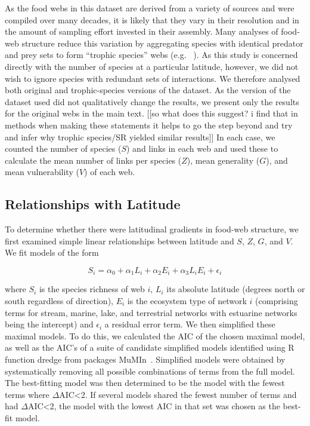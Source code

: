 \documentclass[12pt]{article}
\begin{document}
As the food webs in this dataset are derived from a variety of sources and were compiled over many decades, it
is likely that they vary in their resolution and in the amount of sampling effort invested in their assembly.
Many analyses of food-web structure reduce this variation by aggregating species with identical predator and prey
sets to form ``trophic species'' webs (e.g. ~\citep{Martinez1991,Vermaat2009,Dunne2004,Dunne2013}). As this study
is concerned directly with the number of species at a particular latitude, however, we did not wish to ignore 
species with redundant sets of interactions. We therefore analysed both original and trophic-species versions
of the dataset. As the version of the dataset used did not qualitatively change the results, we present only
the results for the original webs in the main text. [[so what does this suggest? i find that in methods when making these statements it helps to go the step beyond and try and infer why trophic species/SR yielded similar results]] In each case, we counted the number of species ($S$) and 
links in each web and used these to calculate the mean number of links per species ($Z$), mean generality 
($G$), and mean vulnerability ($V$) of each web. 


\subsection*{Relationships with Latitude}

To determine whether there were latitudinal gradients in food-web structure,
we first examined simple linear relationships between latitude and $S$, $Z$, $G$, and $V$. 
We fit models of the form

\begin{equation}
\label{Latfull}
S_{i} = \alpha_{0} + \alpha_{1} L_{i} + \alpha_{2} E_{i} + \alpha_{3} L_{i} E_{i} + \epsilon_{i} 
\end{equation}

where $S_{i}$ is the species richness of web $i$, $L_{i}$ its absolute
latitude (degrees north or south  regardless of direction), $E_{i}$ is the
ecosystem type of network $i$ (comprising terms for stream, marine, lake, and terrestrial networks with estuarine
networks being the intercept) and $\epsilon_{i}$ a residual error term. 
We then simplified these maximal models. To do this, we calculated the AIC
of the chosen maximal model, as well as the AIC's of a suite of candidate simplified models identified
using R~\citep{R} function dredge from packages MuMIn~\citep{MuMIn}. Simplified models were obtained by
systematically removing all possible combinations of terms from the full model.
The best-fitting model was then determined to be the model with the fewest terms 
where $\Delta$AIC\textless2. If several models shared the fewest number of terms 
and had $\Delta$AIC\textless2, the model with the lowest AIC in that set was chosen as the best-fit
model.
\end{document}
